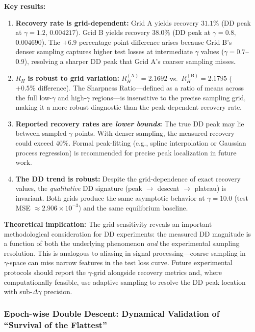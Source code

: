 \documentclass[
  journal=largetwo,
  simfonts=false,
  year=2025,
  volume=37,
]{cup-journal}
\begin{document}
\textbf{Key results:}
\begin{enumerate}
    \item \textbf{Recovery rate is grid-dependent:} Grid A yields recovery $31.1\%$ (DD peak at $\gamma=1.2$, $0.004217$). Grid B yields recovery $38.0\%$ (DD peak at $\gamma=0.8$, $0.004690$). The $+6.9$ percentage point difference arises because Grid B's denser sampling captures higher test losses at intermediate $\gamma$ values ($\gamma=0.7$--$0.9$), resolving a sharper DD peak that Grid A's coarser sampling misses.
    
    \item \textbf{$R_H$ is robust to grid variation:} $R_H^{\mathrm{(A)}} = 2.1692$ vs.\ $R_H^{\mathrm{(B)}} = 2.1795$ ($+0.5\%$ difference). The Sharpness Ratio---defined as a ratio of means across the full low-$\gamma$ and high-$\gamma$ regions---is insensitive to the precise sampling grid, making it a more robust diagnostic than the peak-dependent recovery rate.
    
    \item \textbf{Reported recovery rates are \emph{lower bounds}:} The true DD peak may lie between sampled $\gamma$ points. With denser sampling, the measured recovery could exceed $40\%$. Formal peak-fitting (e.g., spline interpolation or Gaussian process regression) is recommended for precise peak localization in future work.
    
    \item \textbf{The DD trend is robust:} Despite the grid-dependence of exact recovery values, the \emph{qualitative} DD signature (peak $\to$ descent $\to$ plateau) is invariant. Both grids produce the same asymptotic behavior at $\gamma=10.0$ (test MSE $\approx 2.906 \times 10^{-3}$) and the same equilibrium baseline.
\end{enumerate}

\textbf{Theoretical implication:} The grid sensitivity reveals an important methodological consideration for DD experiments: the measured DD magnitude is a function of both the underlying phenomenon \emph{and} the experimental sampling resolution. This is analogous to aliasing in signal processing---coarse sampling in $\gamma$-space can miss narrow features in the test loss curve. Future experimental protocols should report the $\gamma$-grid alongside recovery metrics and, where computationally feasible, use adaptive sampling to resolve the DD peak location with sub-$\Delta\gamma$ precision.

\subsubsection{Epoch-wise Double Descent: Dynamical Validation of ``Survival of the Flattest''}\label{sec:epochwise_dd}
\end{document}
